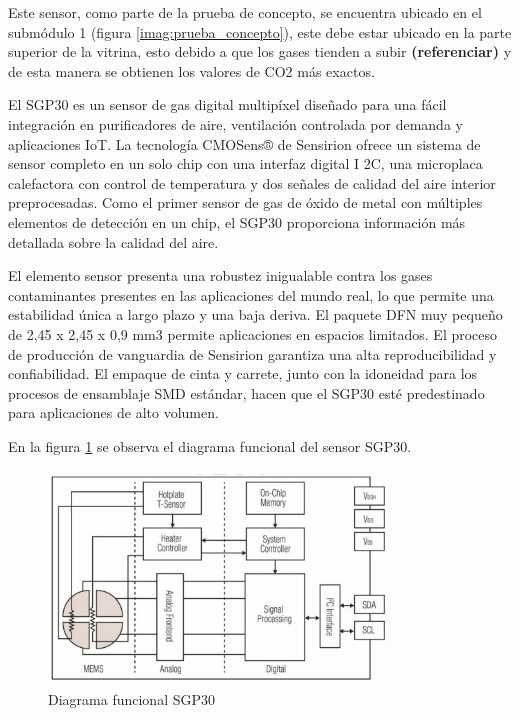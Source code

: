 Este sensor, como parte de la prueba de concepto, se encuentra ubicado en el submódulo 1 (figura \ref{imag:prueba_concepto}), este debe estar ubicado en la parte superior de la vitrina, esto debido a que los gases tienden a subir \textbf{(referenciar)} y de esta manera se obtienen los valores de CO2 más exactos.

El SGP30 es un sensor de gas digital multipíxel diseñado para una fácil integración en purificadores de aire, ventilación controlada por demanda y aplicaciones IoT. La tecnología CMOSens® de Sensirion ofrece un sistema de sensor completo en un solo chip con una interfaz digital I 2C, una microplaca calefactora con control de temperatura y dos señales de calidad del aire interior preprocesadas. Como el primer sensor de gas de óxido de metal con múltiples elementos de detección en un chip, el SGP30 proporciona información más detallada sobre la calidad del aire.

El elemento sensor presenta una robustez inigualable contra los gases contaminantes presentes en las aplicaciones del mundo real, lo que permite una estabilidad única a largo plazo y una baja deriva. El paquete DFN muy pequeño de 2,45 x 2,45 x 0,9 mm3 permite aplicaciones en espacios limitados. El proceso de producción de vanguardia de Sensirion garantiza una alta reproducibilidad y confiabilidad. El empaque de cinta y carrete, junto con la idoneidad para los procesos de ensamblaje SMD estándar, hacen que el SGP30 esté predestinado para aplicaciones de alto volumen.

En la figura \ref{imag:diagrama_funcional} se observa el diagrama funcional del sensor SGP30.

\begin{figure}[H]
    \centering
    \includegraphics[width=9cm, height=5.7cm]{imagenes/diagrama_funcional_SGP30.jpg}
    \caption{Diagrama funcional SGP30}
    \label{imag:diagrama_funcional}
 \end{figure}

